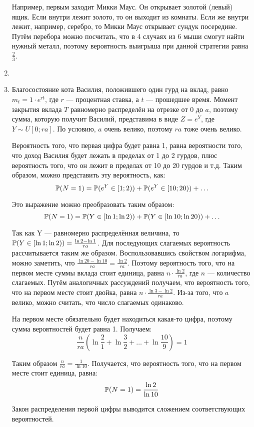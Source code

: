 \begin{enumerate}
Например, первым заходит Микки Маус. Он открывает золотой (левый) ящик.
Если внутри лежит золото, то он выходит из комнаты. Если же внутри лежит, например, серебро,
то Микки Маус открывает сундук посередине.
Путём перебора можно посчитать, что в 4 случаях из 6 мыши смогут найти нужный металл,
поэтому вероятность выигрыша при данной стратегии равна $\frac{2}{3}$.

\item

\item Благосостояние кота Василия, положившего один гурд на вклад,
равно $m_t = 1\cdot e^{rt}$, где $r$ — процентная ставка, а $t$ — прошедшее время.
Момент закрытия вклада $T$ равномерно распределён на отрезке от 0 до $a$,
поэтому сумма, которую получит Василий, представима в виде $Z = e^{Y}$, где $Y \sim U[0; ra]$.
По условию, $a$ очень велико, поэтому $ra$ тоже очень велико.

Вероятность того, что первая цифра будет равна 1, равна вероятности того,
что доход Василия будет лежать в пределах от 1 до 2 гурдов, плюс вероятность того,
что он лежит в пределах от 10 до 20 гурдов и т.д.
Таким образом, можно представить эту вероятность, как:
\[
\P(N=1) = \P(e^Y \in [1;2) ) + \P(e^Y \in [10; 20) ) + \ldots
\]

Это выражение можно преобразовать таким образом:
\[
\P(N=1) = \P(Y \in [\ln 1; \ln2) ) + \P(Y \in [\ln 10; \ln 20) ) + \ldots
\]

Так как Y — равномерно распределённая величина,
то $\P(Y \in [\ln 1; \ln2) ) = \frac{\ln 2 - \ln 1}{ra}$.
Для последующих слагаемых вероятность рассчитывается таким же образом.
Воспользовавшись свойством логарифма, можно заметить,
что $\frac{\ln 20 - \ln 10}{ra} = \frac{\ln 2}{ra}$.
Поэтому вероятность того, что на первом месте суммы вклада стоит единица,
равна $n\cdot \frac{\ln 2}{ra}$, где $n$ — количество слагаемых.
Путём аналогичных рассуждений получаем, что вероятность того,
что на первом месте стоит двойка, равна $n\cdot \frac{\ln 3- \ln 2}{ra}$.
Из-за того, что $a$ велико, можно считать, что число слагаемых одинаково.

На первом месте обязательно будет находиться какая-то цифра,
поэтому сумма вероятностей будет равна 1. Получаем:
\[
\dfrac{n}{ra}\left(\ln \frac{2}{1} + \ln \frac{3}{2} + \ldots + \ln \frac{10}{9}\right) = 1
\]

Таким образом $\frac{n}{ra} = \frac{1}{\ln 10}$.
Получается, что вероятность того, что на первом месте стоит единица, равна:
\[
\P (N=1) = \dfrac{\ln 2}{\ln 10}
\]

Закон распределения первой цифры выводится сложением соответствующих вероятностей.

\end{enumerate}
